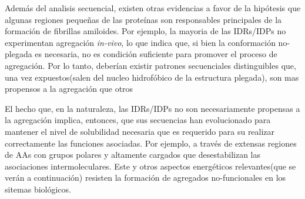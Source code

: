 Además del analisis secuencial, existen otras evidencias a favor de la hipótesis que algunas regiones pequeñas de las proteínas son responsables principales de la formación de fibrillas amiloides. 
Por ejemplo, la mayoria de las IDRs/IDPs no experimentan agregación \textit{in-vivo}\cite{linding2004comparative}, lo que indica que, si bien la conformación no-plegada es necesaria, no es condición suficiente para promover el proceso de agregación.
Por lo tanto, deberían existir patrones secuenciales distinguibles que, una vez expuestos(salen del nucleo hidrofóbico de la estructura plegada), son mas propensos a la agregación que otros  


% 

El hecho que, en la naturaleza, las IDRs/IDPs no son necesariamente propensas a la agregación implica, entonces, que sus secuencias han evolucionado para mantener el nivel de solubilidad necesaria que es requerido para su 
realizar correctamente las funciones asociadas. Por ejemplo, a través de extensas regiones de AAs con grupos polares y altamente cargados que desestabilizan las asociaciones intermoleculares.
Este y otros aspectos energéticos relevantes(que se verán a continuación) resisten la formación de agregados no-funcionales en los sitemas biológicos.  

